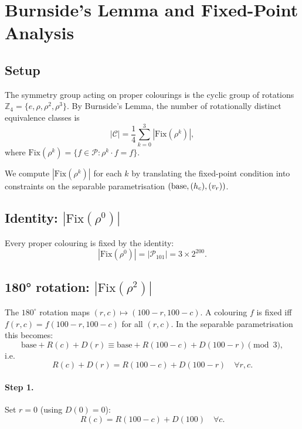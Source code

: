 \documentclass{article}
\newcommand{\calC}{\mathcal{C}}
\newcommand{\calP}{\mathcal{P}}
\newcommand{\Fix}{\mathrm{Fix}}
\begin{document}
\section{Burnside's Lemma and Fixed-Point Analysis}
\label{sec:burnside}

\subsection{Setup}

The symmetry group acting on proper colourings is the cyclic
group of rotations
$\mathbb{Z}_4 = \{e, \rho, \rho^2, \rho^3\}$.
By Burnside's Lemma, the number of rotationally distinct
equivalence classes is
\begin{equation}
  |\calC| = \frac{1}{4}\sum_{k=0}^{3}|\Fix(\rho^k)|,
  \label{eq:burnside}
\end{equation}
where $\Fix(\rho^k) = \{f\in\calP : \rho^k\cdot f = f\}$.

We compute $|\Fix(\rho^k)|$ for each $k$ by translating the
fixed-point condition into constraints on the separable
parametrisation $({\rm base},(h_c),(v_r))$.

\subsection{Identity: $|\Fix(\rho^0)|$}

Every proper colouring is fixed by the identity:
\[
  |\Fix(\rho^0)| = |\calP_{101}| = 3\times 2^{200}.
\]

\subsection{180° rotation: $|\Fix(\rho^2)|$}
\label{subsec:180}

The $180^\circ$ rotation maps $(r,c)\mapsto(100-r,100-c)$.  A
colouring $f$ is fixed iff $f(r,c) = f(100-r,100-c)$ for all
$(r,c)$.  In the separable parametrisation this becomes:
\[
  \mathrm{base}+R(c)+D(r)
  \equiv \mathrm{base}+R(100-c)+D(100-r)\pmod3,
\]
i.e.\
\begin{equation}
  R(c)+D(r) = R(100-c)+D(100-r)\quad\forall r,c.
  \label{eq:180cond}
\end{equation}

\paragraph{Step 1.} Set $r=0$ (using $D(0)=0$):
\begin{equation}
  R(c) = R(100-c)+D(100)\quad\forall c.
  \tag{$\star$}
  \label{eq:star180}
\end{equation}
\end{document}
